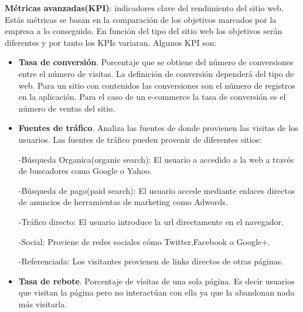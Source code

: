 \vspace{5 mm}

\textbf{Métricas avanzadas(KPI)}: indicadores clave del rendimiento del sitio web. Estás métricas se basan en la comparación de los objetivos marcados por la empresa a lo conseguido. En función del tipo del sitio web los objetivos serán diferentes y por tanto los KPIs variaran. Algunos KPI son:

\begin{itemize}


\item \textbf{Tasa de conversión}. Porcentaje que se obtiene del número de conversiones entre el número de visitas. La definición de conversión dependerá del tipo de web. Para un sitio con contenidos las conversiones son el número de registros en la aplicación. Para el caso de un e-commerce la tasa de conversión es el número de ventas del sitio.

\item \textbf{Fuentes de tráfico}. Analiza las fuentes de donde provienen las visitas de los usuarios. Las fuentes de tráfico pueden provenir de diferentes sitios:

-Búsqueda Organica(organic search): El usuario a accedido a la web a través de buscadores como Google o Yahoo.

\vspace{5 mm}

-Búsqueda de pago(paid search): El usuario accede mediante enlaces directos de anuncios de herramientas de marketing como Adwords.

\vspace{5 mm}

-Tráfico directo: El usuario introduce la url directamente en el navegador.

\vspace{5 mm}

-Social: Proviene de redes sociales cómo Twitter,Facebook o Google+.

\vspace{5 mm}

-Referenciada: Los visitantes provienen de links directos de otras páginas.
 
\item \textbf{Tasa de rebote}. Porcentaje de visitas de una sola página. Es decir usuarios que visitan la página pero no interactúan con ella ya que la abandonan nada más visitarla.

\end{itemize}

